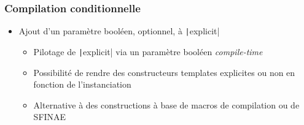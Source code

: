 \documentclass[C++.tex]{subfiles}
\begin{document}
\begin{frame}[fragile]
	\frametitle{Compilation conditionnelle}
	\begin{itemize}
		\item Ajout d'un paramètre booléen, optionnel, à \texttt|explicit|
		\begin{itemize}
			\item Pilotage de \texttt|explicit| via un paramètre booléen \textit{compile-time}
			\item Possibilité de rendre des constructeurs templates explicites ou non en fonction de l'instanciation
			\item Alternative à des constructions à base de macros de compilation ou de SFINAE
		\end{itemize}
	\end{itemize}

\end{frame}
\end{document}
